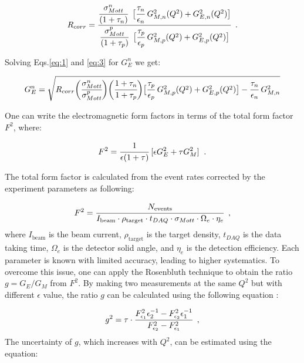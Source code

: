 \documentclass[11pt]{article}
\begin{document}
\begin{equation}
R_{corr} = \cfrac{ \cfrac{\sigma_{Mott}^n}{(1+\tau_n)}\;\; \big[\cfrac{\tau_n}{\epsilon_n} \;G^{2}_{M,n}(Q^2) +  G^{2}_{E,n}(Q^2)\big]}{ \cfrac{\sigma_{Mott}^p}{(1+\tau_p)}\;\; \big[\cfrac{\tau_p}{\epsilon_p} \;G^{2}_{M,p}(Q^2) +  G^{2}_{E,p}(Q^2)\big]} \;\; .
\end{equation}

Solving Eqs.\ref{eq:1} and \ref{eq:3} for $G_E^n$ we get: 

\begin{equation}
G_E^n = \sqrt{R_{corr}\bigg(\cfrac{ \sigma_{Mott}^n}{ \sigma_{Mott}^p}\bigg) \bigg(\cfrac{1+\tau_n}{1+\tau_p}\bigg)\big[\cfrac{\tau_p}{\epsilon_p} \; G^{2}_{M,p}(Q^2) + G^{2}_{E,p}(Q^2)\big] - \cfrac{\tau_n}{\epsilon_n}\; G_{M,n}^2  }
\end{equation}

One can write the electromagnetic form factors in terms of the total form factor $F^2$, where:

\begin{equation}
F^2 = \cfrac{1}{\epsilon (1 + \tau)} \; [\epsilon G_E^2 + \tau G_M^2] \;\; .
\end{equation}

The total form factor is calculated from the event rates corrected by the experiment parameters as following: 

\begin{equation}
F^2 = \cfrac{ N_{\text{events}}}{I_{\text{beam}} \cdot \rho_{\text{target}} \cdot t_{DAQ} \cdot \sigma_{Mott} \cdot \Omega_e \cdot \eta_e} \;\; ,
\end{equation}
where $I_{\text{beam}}$ is the beam current, $\rho_{\text{target}}$ is the target density, $t_{DAQ}$ is the data taking time, $\Omega_e$ is the detector solid angle, and $\eta_e$ is the detection efficiency. Each parameter is known with limited accuracy, leading to higher systematics. To overcome this issue, one can apply the Rosenbluth technique to obtain the ratio $g = G_E/G_M$ from $F^2$. By making two measurements at the same $Q^2$ but with different $\epsilon$ value, the ratio $g$ can be calculated using the following equation \cite{bogdan}:

\begin{equation}
g^2 = \tau \cdot \cfrac{F_{\epsilon_1}^2 \epsilon_2^{-1}- F_{\epsilon_2}^2 \epsilon_1^{-1}}{F_{\epsilon_2}^2  - F_{\epsilon_1}^2 } \;\; ,
\end{equation} 
The uncertainty of $g$, which increases with $Q^2$, can be estimated using the equation:
\end{document}
